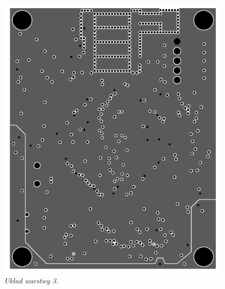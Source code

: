 \documentclass[eng,printmode]{mgr}
\begin{document}
\begin{center}\centering
\vspace*{\fill}
\begin{figure}[!h]
    \centering
    \label{fig:power}
    \includegraphics[width=\textwidth]{pcb/power.png}
    \caption{\textit{\scriptsize Układ warstwy 3.}}
\end{figure}
\vfill
\end{center}
\newpage
\end{document}
